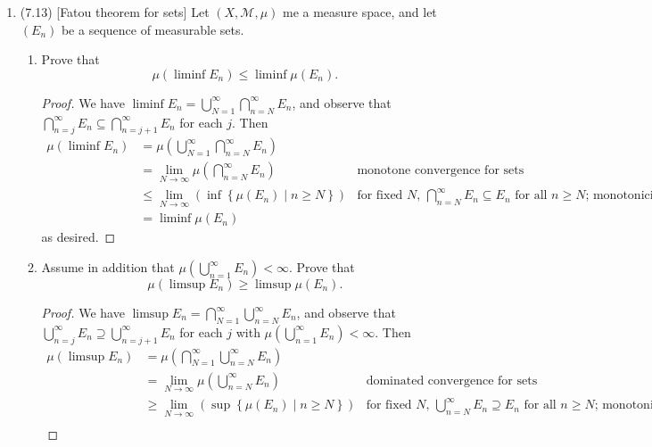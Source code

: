 \documentclass[11pt]{article}
\newcommand{\cbr}[1]{\left\{#1\right\}}
\begin{document}
\begin{enumerate}
\begin{enumerate}
\begin{proof}
            Then if $(E_n)$ converges to $E$ pointwise we have from the above result that $\limsup E_n = \liminf E_n = E$; since $\limsup E_n$ and $\liminf E_n$ were shown to be measurable whenever every $E_n$ is measurable, $E$ is measurable.
        \end{proof}
    \end{enumerate}
    \item (7.13) [Fatou theorem for sets] Let $(X,\mathscr{M},\mu)$ me a measure space, and let $(E_n)$ be a sequence of measurable sets. \begin{enumerate}
        \item Prove that \[\mu(\liminf E_n)\leq \liminf \mu(E_n).\] \begin{proof}
            We have $\liminf E_n = \bigcup_{N=1}^\infty\bigcap_{n=N}^\infty E_n$, and observe that $\bigcap_{n=j}^\infty E_n\subseteq \bigcap_{n=j+1}^\infty E_n$ for each $j$. Then \begin{align*}
                \mu(\liminf E_n) &= \mu\left(\bigcup_{N=1}^\infty\bigcap_{n=N}^\infty E_n\right)\\
                &= \lim_{N\to\infty} \mu\left(\bigcap_{n=N}^\infty E_n\right) & \text{monotone convergence for sets}\\
                &\leq \lim_{N\to\infty}(\inf\cbr{\mu(E_n)\mid n\geq N}) & \text{for fixed $N$, $\bigcap_{n=N}^\infty E_n \subseteq E_n$ for all $n\geq N$; monotonicity}\\
                &= \liminf \mu(E_n)
            \end{align*} as desired.
        \end{proof}
        \item Assume in addition that $\mu(\bigcup_{n=1}^\infty E_n)< \infty$. Prove that \[\mu(\limsup E_n)\geq \limsup \mu(E_n).\] \begin{proof}
            We have $\limsup E_n = \bigcap_{N=1}^\infty \bigcup_{n=N}^\infty E_n$, and observe that $\bigcup_{n=j}^\infty E_n\supseteq \bigcup_{n=j+1}^\infty E_n$ for each $j$ with $\mu(\bigcup_{n=1}^\infty E_n)< \infty$. Then \begin{align*}
                \mu(\limsup E_n) &= \mu\left(\bigcap_{N=1}^\infty \bigcup_{n=N}^\infty E_n\right)\\
                &= \lim_{N\to \infty} \mu\left(\bigcup_{n=N}^\infty E_n\right) & \text{dominated convergence for sets}\\
                &\geq \lim_{N\to\infty}(\sup\cbr{\mu(E_n)\mid n\geq N}) & \text{for fixed $N$, $\bigcup_{n=N}^\infty E_n\supseteq E_n$ for all $n\geq N$; monotonicity}\\

\end{align*}
\end{proof}
\end{enumerate}
\end{enumerate}
\end{document}
